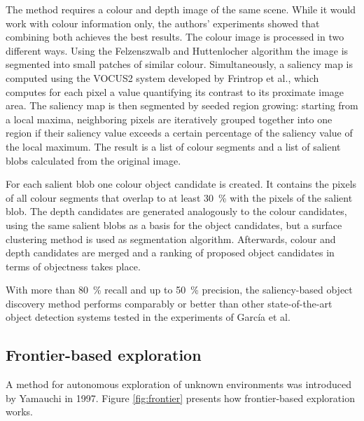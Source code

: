 \documentclass[a4paper,11pt,english]{article}
\begin{document}
The method requires a colour and depth image of the same scene.
While it would work with colour information only, the authors' experiments showed that combining both achieves the best results.
The colour image is processed in two different ways. 
Using the Felzenszwalb and Huttenlocher algorithm\cite{felzenszwalb2004efficient} the image is segmented into small patches of similar colour.
Simultaneously, a saliency map is computed using the VOCUS2 system developed by Frintrop et al.\cite{frintrop2015traditional}, which computes for each pixel a value quantifying its contrast to its proximate image area.
The saliency map is then segmented by seeded region growing: starting from a local maxima, neighboring pixels are iteratively grouped together into one region if their saliency value exceeds a certain percentage of the saliency value of the local maximum.
The result is a list of colour segments and a list of salient blobs calculated from the original image.

For each salient blob one colour object candidate is created.
It contains the pixels of all colour segments that overlap to at least \SI{30}{\percent} with the pixels of the salient blob.
The depth candidates are generated analogously to the colour candidates, using the same salient blobs as a basis for the object candidates, but a surface clustering method is used as segmentation algorithm.
Afterwards, colour and depth candidates are merged and a ranking of proposed object candidates in terms of \glqq{}objectness\grqq{} takes place.

With more than \SI{80}{\percent} recall and up to \SI{50}{\percent} precision, the saliency-based object discovery method performs comparably or better than other state-of-the-art object detection systems tested in the experiments of García et al.

\subsection{Frontier-based exploration}
\label{Theoretical_background:Frontier-based_exploration}
A method for autonomous exploration of unknown environments was introduced by Yamauchi in 1997\cite{yamauchi1997frontier}.
Figure \ref{fig:frontier} presents how frontier-based exploration works.
\end{document}
